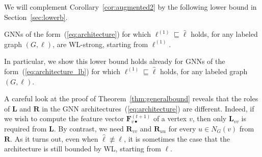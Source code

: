 We will complement Corollary~\ref{cor:augmented2} by the following lower bound in Section~\ref{sec:lowerb}.

\begin{theorem}
GNNs of the form~(\ref{eq:architecture}) for which 
$\pmb{\ell}^{(1)}\sqsubseteq\hat{\pmb{\ell}}$ holds, for any labeled graph $(G,\pmb{\ell})$, are WL-strong, starting from $\pmb{\ell}^{(1)}$. 
\end{theorem}
In particular, we show this lower bound holds already for GNNs of the form~(\ref{eq:architecture_lb})
for which $\pmb{\ell}^{(1)}\sqsubseteq\hat{\pmb{\ell}}$ holds, for any labeled graph $(G,\pmb{\ell})$.





A careful look at the  proof of Theorem~\ref{thm:generalbound} reveals that
the roles of $\mathbf{L}$ and $\mathbf{R}$ in the GNN architectures~(\ref{eq:architecture})
are different. Indeed, if we wish to compute the feature vector $\mathbf{F}^{(t+1)}_{v\bullet}$ of a vertex $v$, then only $\mathbf{L}_{vv}$
is required from $\mathbf{L}$. By contrast, we need  $\mathbf{R}_{vv}$ and $\mathbf{R}_{uu}$ for every $u\in N_G(v)$ from $\mathbf{R}$. As it turns out,
even when $\hat{\pmb{\ell}}\not\equiv \pmb{\ell}$, it is sometimes the case that the architecture is still bounded by WL, starting from $\pmb{\ell}$. 

